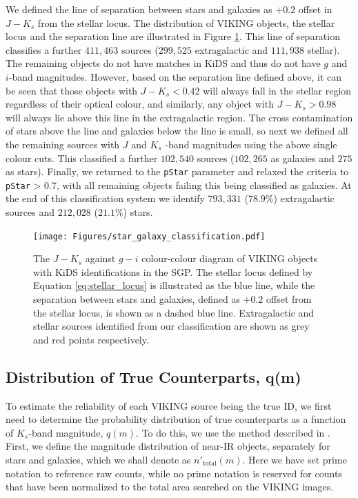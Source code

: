We defined the line of separation between stars and galaxies as $+0.2$ offset in $J - K_s$ from the stellar locus. The distribution of VIKING objects, the stellar locus and the separation line are illustrated in Figure \ref{fig:star_galaxy_classification}. This line of separation classifies a further $411,463$ sources ($299,525$ extragalactic and $111,938$ stellar). The remaining objects do not have matches in KiDS and thus do not have $g$ and $i$-band magnitudes. However, based on the separation line defined above, it can be seen that those objects with $J - K_s < 0.42$ will always fall in the stellar region regardless of their optical colour, and similarly, any object with  $J - K_s > 0.98$ will always lie above this line in the extragalactic region. The cross contamination of stars above the line and galaxies below the line is small, so next we defined all the remaining sources with $J$ and $K_s$ -band magnitudes using the above single colour cuts. This classified a further $102,540$ sources ($102,265$ as galaxies and $275$ as stars). Finally, we returned to the \texttt{pStar} parameter and relaxed the criteria to \texttt{pStar} > 0.7, with all remaining objects failing this being classified as galaxies. At the end of this classification system we identify $793,331$ ($78.9\%$) extragalactic sources and $212,028$ ($21.1\%$) stars.

\begin{figure}
    \centering
	\texttt{[image: Figures/star\_galaxy\_classification.pdf]}
	\caption[$J - K_s$ against $g-i$ colour-colour plot for VIKING objects in the SGP]{The $J - K_s$ against $g-i$ colour-colour diagram of VIKING objects with KiDS identifications in the SGP. The stellar locus defined by Equation \ref{eq:stellar_locus} is illustrated as the blue line, while the separation between stars and galaxies, defined as $+0.2$ offset from the stellar locus, is shown as a dashed blue line. Extragalactic and stellar sources identified from our classification are shown as grey and red points respectively.}
	\label{fig:star_galaxy_classification}
\end{figure}

\subsection{Distribution of True Counterparts, q(m)}
\label{sec:true_counterparts_distribution}

To estimate the reliability of each VIKING source being the true ID, we first need to determine the probability distribution of true counterparts as a function of $K_s$-band magnitude, $q(m)$. To do this, we use the method described in \citealt{Ciliegi_2003}. First, we define the magnitude distribution of near-IR objects, separately for stars and galaxies, which we shall denote as $n'_{\textrm{total}}(m)$. Here we have set prime notation to reference raw counts, while no prime notation is reserved for counts that have been normalized to the total area searched on the VIKING images. 

